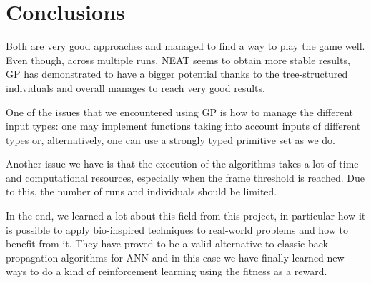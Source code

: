 \section{Conclusions}
Both are very good approaches and managed to find a way to play the game well. Even
though, across multiple runs, NEAT seems to obtain more stable results, GP has
demonstrated to have a bigger potential thanks to the tree-structured individuals and overall
manages to reach very good results.

One of the issues that we encountered using GP is how to manage the different input types:
one may implement functions taking into account inputs of different types or, alternatively,
one can use a strongly typed primitive set as we do.

Another issue we have is that the execution of the algorithms takes a lot of time and
computational resources, especially when the frame threshold is reached. Due to this, the
number of runs and individuals should be limited.

In the end, we learned a lot about this field from this project, in particular how it is possible to
apply bio-inspired techniques to real-world problems and how to benefit from it. They have
proved to be a valid alternative to classic back-propagation algorithms for ANN and in this
case we have finally learned new ways to do a kind of reinforcement learning using the
fitness as a reward.
